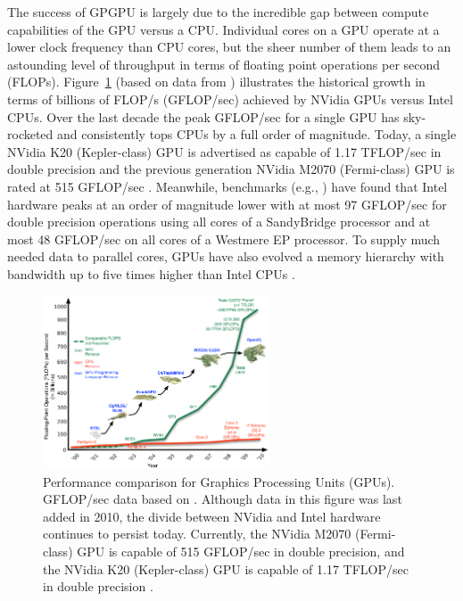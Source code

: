 \documentclass{report}
\begin{document}
The success of GPGPU is largely due to the incredible gap between compute capabilities of the GPU versus a CPU. Individual cores on a GPU operate at a lower clock frequency than CPU cores, but the sheer number of them leads to an astounding level of throughput in terms of floating point operations per second (FLOPs). Figure~\ref{fig:floating-point-operations-per-second} (based on data from \cite{Behr2009, OpenCL2009}) illustrates the historical growth in terms of billions of FLOP/s (GFLOP/sec) achieved by NVidia GPUs versus Intel CPUs. Over the last decade the peak GFLOP/sec for a single GPU has sky-rocketed and consistently tops CPUs by a full order of magnitude. Today, a single NVidia K20 (Kepler-class) GPU is advertised as capable of 1.17 TFLOP/sec in double precision \cite{KeplerFactSheet} and the previous generation NVidia M2070 (Fermi-class) GPU is rated at 515 GFLOP/sec \cite{Fermi2009}. Meanwhile, benchmarks (e.g., \cite{Vladimirov2012}) have found that Intel hardware peaks at an order of magnitude lower with at most 97 GFLOP/sec for double precision operations using all cores of a SandyBridge processor and at most 48 GFLOP/sec on all cores of a Westmere EP processor. To supply much needed data to parallel cores, GPUs have also evolved a memory hierarchy with bandwidth up to five times higher than Intel CPUs \cite{CudaGuide2013}.

\begin{figure}
\centering
\includegraphics[width=0.6\textwidth]{../figures/prospectus/GPU_Evolution_opencl.pdf}
\caption{Performance comparison for Graphics Processing Units (GPUs). GFLOP/sec data based on \cite{Behr2009, OpenCL2009}. Although data in this figure was last added in 2010, the divide between NVidia and Intel hardware continues to persist today. Currently, the NVidia M2070 (Fermi-class) GPU is capable of 515 GFLOP/sec in double precision, and the NVidia K20 (Kepler-class) GPU is capable of 1.17 TFLOP/sec in double precision \cite{CudaGuide2013}.}
\label{fig:floating-point-operations-per-second}
\end{figure}
\end{document}
